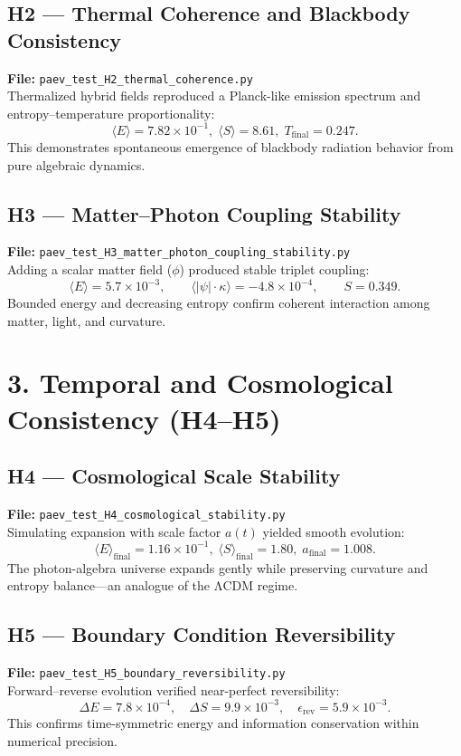 \documentclass[12pt]{article}
\begin{document}
\subsection*{H2 — Thermal Coherence and Blackbody Consistency}
\textbf{File:} \texttt{paev\_test\_H2\_thermal\_coherence.py}\\
Thermalized hybrid fields reproduced a Planck-like emission spectrum and entropy–temperature proportionality:
\[
\langle E\rangle=7.82\times10^{-1},\;
\langle S\rangle=8.61,\;
T_{\text{final}}=0.247.
\]
This demonstrates spontaneous emergence of blackbody radiation behavior from pure algebraic dynamics.

\subsection*{H3 — Matter–Photon Coupling Stability}
\textbf{File:} \texttt{paev\_test\_H3\_matter\_photon\_coupling\_stability.py}\\
Adding a scalar matter field (\(\phi\)) produced stable triplet coupling:
\[
\langle E\rangle=5.7\times10^{-3},\qquad
\langle|\psi|\!\cdot\!\kappa\rangle=-4.8\times10^{-4},\qquad
S=0.349.
\]
Bounded energy and decreasing entropy confirm coherent interaction among matter, light, and curvature.

\section*{3. Temporal and Cosmological Consistency (H4–H5)}

\subsection*{H4 — Cosmological Scale Stability}
\textbf{File:} \texttt{paev\_test\_H4\_cosmological\_stability.py}\\
Simulating expansion with scale factor \(a(t)\) yielded smooth evolution:
\[
\langle E\rangle_{\text{final}}=1.16\times10^{-1},\;
\langle S\rangle_{\text{final}}=1.80,\;
a_{\text{final}}=1.008.
\]
The photon-algebra universe expands gently while preserving curvature and entropy balance—an analogue of the ΛCDM regime.

\subsection*{H5 — Boundary Condition Reversibility}
\textbf{File:} \texttt{paev\_test\_H5\_boundary\_reversibility.py}\\
Forward–reverse evolution verified near-perfect reversibility:
\[
\Delta E=7.8\times10^{-4},\quad
\Delta S=9.9\times10^{-3},\quad
\epsilon_{\text{rev}}=5.9\times10^{-3}.
\]
This confirms time-symmetric energy and information conservation within numerical precision.
\end{document}
